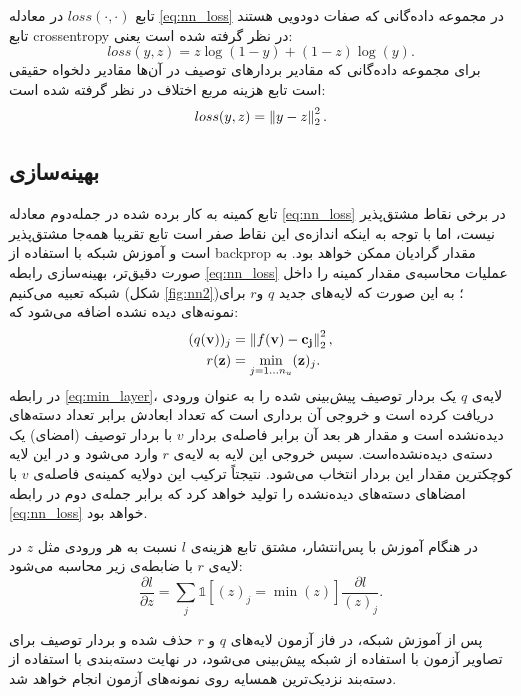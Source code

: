  تابع $loss(\cdot, \cdot)$ در معادله \eqref{eq:nn_loss} در مجموعه داده‌گانی که صفات دودویی هستند تابع \gls{crossentropy} در نظر گرفته شده است یعنی:
 \begin{equation}
 loss(y,z) = z \log(1-y) + (1-z) \log(y).
 \end{equation}
 برای مجموعه داده‌گانی که مقادیر بردارهای توصیف در آن‌ها مقادیر دلخواه حقیقی است تابع هزینه مربع اختلاف در نظر گرفته شده است:
 \begin{equation}
 loss(y,z) = \left \lVert y-z \right \rVert_2^2.
 \end{equation}
 \subsection{بهینه‌سازی }\label{opt_nn}

 تابع کمینه به کار برده شده در جمله‌دوم معادله
\eqref{eq:nn_loss}
در برخی نقاط مشتق‌پذیر نیست، اما با توجه به اینکه اندازه‌ی این نقاط صفر است تابع تقریبا همه‌جا مشتق‌پذیر است و آموزش شبکه با استفاده از \gls{backprop}
 مقدار گرادیان ممکن خواهد بود. به صورت دقیق‌تر، بهینه‌سازی رابطه \eqref{eq:nn_loss} عملیات محاسبه‌ی مقدار کمینه را داخل شبکه تعبیه می‌کنیم (شکل \ref{fig:nn2})؛ به این صورت که لایه‌های جدید $q$ و$r$ برای نمونه‌های دیده نشده اضافه می‌شود که:
\begin{align}
\label{eq:min_layer}
(q(\mathbf{v}))_j &=  \left \lVert f(\mathbf{v) - c_j} \right \rVert_2^2, \\
r(\mathbf{z}) &= \min_{j=1\ldots n_u} (\mathbf{z})_j.
\end{align}
در رابطه \eqref{eq:min_layer}، لایه‌ی $q$ یک بردار توصیف پیش‌بینی شده را به عنوان ورودی دریافت کرده است و خروجی آن برداری است که تعداد ابعادش برابر تعداد دسته‌های دیده‌نشده است و مقدار هر بعد آن برابر فاصله‌ی بردار $v$ با بردار توصیف (امضای) یک دسته‌ی دیده‌نشده‌است.
 سپس خروجی این لایه به لایه‌ی $r$ وارد می‌شود و در این لایه کوچکترین مقدار این بردار انتخاب می‌شود. نتیجتاً ترکیب این دولایه کمینه‌ی فاصله‌ی $v$ با امضاهای دسته‌های دیده‌نشده را تولید خواهد کرد که برابر جمله‌ی دوم در رابطه \eqref{eq:nn_loss} خواهد بود.

در هنگام آموزش با پس‌انتشار، مشتق تابع هزینه‌ی $l$ نسبت به هر ورودی مثل $z$ در لایه‌ی $r$ با ضابطه‌ی زیر محاسبه می‌شود:
\begin{equation}
\label{eq:grad_min}
\frac{\partial l}{\partial z} = \sum_j \mathds{1}[(z)_j=\min(z)]  \frac{\partial l}{(z)_j}.
\end{equation}

پس از آموزش شبکه، در فاز آزمون لایه‌های $q$ و $r$ حذف شده و بردار توصیف برای تصاویر آزمون با استفاده از شبکه پیش‌بینی می‌شود، در نهایت دسته‌بندی با استفاده از دسته‌بند نزدیک‌ترین همسایه روی نمونه‌های آزمون انجام خواهد شد. 

